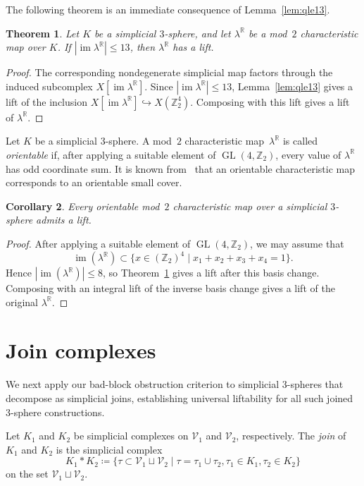 \documentclass{amsart}
\newcommand{\Z}{\mathbb{Z}}
\newcommand{\R}{\mathbb{R}}
\newcommand{\cV}{\mathcal{V}}
\DeclareMathOperator{\GL}{GL}
\DeclareMathOperator{\im}{im}
\newtheorem{theorem}{Theorem}[section]
\newtheorem{corollary}[theorem]{Corollary}
\theoremstyle{definition}
\theoremstyle{remark}
\begin{document}
The following theorem is an immediate consequence of Lemma~\ref{lem:qle13}.
\begin{theorem}\label{thm:image-size-13}
    Let $K$ be a simplicial $3$-sphere, and let $\lambda^\R$ be a mod~$2$ characteristic map over $K$.
    If $|\im \lambda^\R| \leq 13$, then $\lambda^\R$ has a lift.
\end{theorem}
\begin{proof}
    The corresponding nondegenerate simplicial map factors through the induced subcomplex $X[\im \lambda^\R]$.
    Since $|\im \lambda^\R|\leq 13$, Lemma~\ref{lem:qle13} gives a lift of the inclusion $X[\im \lambda^\R]\hookrightarrow X(\Z_2^4)$.
    Composing with this lift gives a lift of $\lambda^\R$.
\end{proof}

Let $K$ be a simplicial $3$-sphere.
A mod~$2$ characteristic map~$\lambda^\R$ is called \emph{orientable} if, after applying a suitable element of
$\GL(4,\Z_2)$, every value of $\lambda^{\R}$ has odd coordinate sum.
It is known from~\cite{Nakayama-Nishimura2005} that an orientable characteristic map corresponds to an orientable small cover.
 
\begin{corollary}\label{cor:orientable-small-cover}
    Every orientable mod~$2$ characteristic map over a simplicial $3$-sphere admits a lift.
\end{corollary}
\begin{proof}
    After applying a suitable element of $\GL(4,\Z_2)$, we may assume that
    $$
        \im(\lambda^{\R})\subset \{x\in (\Z_2)^4 \mid x_1+x_2+x_3+x_4=1\}.
    $$
    Hence $|\im(\lambda^{\R})|\le 8$, so Theorem~\ref{thm:image-size-13} gives a lift after this basis change.
    Composing with an integral lift of the inverse basis change gives a lift of the original $\lambda^\R$.
\end{proof}


\section{Join complexes} \label{join complex}

We next apply our bad-block obstruction criterion to simplicial 3-spheres that decompose as simplicial joins, establishing universal liftability for all such joined 3-sphere constructions.

Let $K_1$ and $K_2$ be simplicial complexes on $\cV_1$ and $\cV_2$, respectively. The \emph{join} of $K_1$ and $K_2$ is the simplicial complex 
	$$
	    K_1*K_2 \coloneq \{\tau\subset \cV_1\sqcup \cV_2 \mid \tau = \tau_1\cup \tau_2, \tau_1\in K_1, \tau_2\in K_2\}
	$$
on the set $\cV_1\sqcup \cV_2$.
\end{document}
